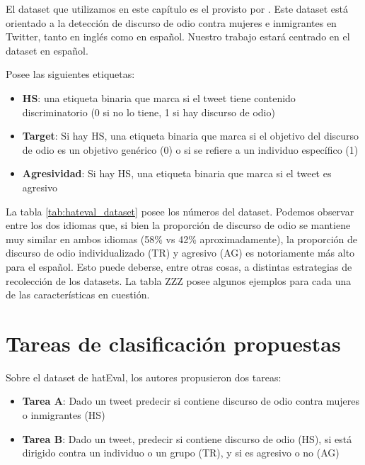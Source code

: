 El dataset que utilizamos en este capítulo es el provisto por \citet{hateval2019semeval}. Este dataset está orientado a la detección de discurso de odio contra mujeres e inmigrantes en Twitter, tanto en inglés como en español. Nuestro trabajo estará centrado en el dataset en español.

Posee las siguientes etiquetas:

\begin{itemize}
    \item \textbf{HS}: una etiqueta binaria que marca si el tweet tiene contenido discriminatorio (0 si no lo tiene, 1 si hay discurso de odio)
    \item \textbf{Target}: Si hay HS, una etiqueta binaria que marca si el objetivo del discurso de odio es un objetivo genérico (0) o si se refiere a un individuo específico (1)
    \item \textbf{Agresividad}: Si hay HS, una etiqueta binaria que marca si el tweet es agresivo
\end{itemize}


La tabla \ref{tab:hateval_dataset} posee los números del dataset. Podemos observar entre los dos idiomas que, si bien la proporción de discurso de odio se mantiene muy similar en ambos idiomas (58\% vs 42\% aproximadamente), la proporción de discurso de odio individualizado (TR) y agresivo (AG) es notoriamente más alto para el español. Esto puede deberse, entre otras cosas, a distintas estrategias de recolección de los datasets. La tabla ZZZ posee algunos ejemplos para cada una de las características en cuestión.

\section{Tareas de clasificación propuestas}

Sobre el dataset de hatEval, los autores propusieron dos tareas:

\newcommand{\subtaska}[0]{\textbf{Tarea A}}
\newcommand{\subtaskb}[0]{\textbf{Tarea B}}

\begin{itemize}
    \item \subtaska{}: Dado un tweet predecir si contiene discurso de odio contra mujeres o inmigrantes (HS)
    \item \subtaskb{}: Dado un tweet, predecir si contiene discurso de odio (HS), si está dirigido contra un individuo o un grupo (TR), y si es agresivo o no (AG)
\end{itemize}

